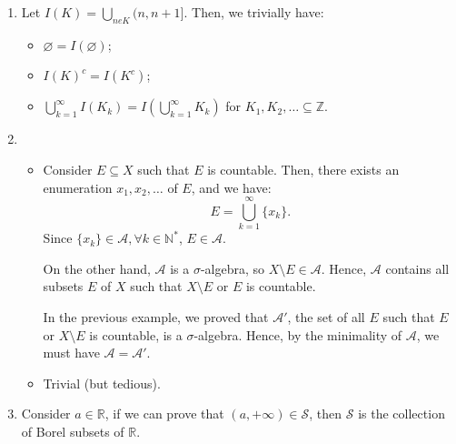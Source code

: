 \begin{enumerate}[label=\textbf{2B.\arabic*}]
  \item Let \( I(K) = \bigcup_{n e K} (n, n + 1] \). Then, we trivially have:
    \begin{itemize}
      \item \( \varnothing = I(\varnothing) \);
      \item \( I(K)^{c} = I(K^{c}) \);
      \item \( \bigcup_{k = 1}^{\infty} I(K_{k}) = I \left( \bigcup_{k =
        1}^{\infty} K_{k} \right)  \) for \( K_{1}, K_{2}, \ldots \subseteq
        \mathbb{Z} \).
    \end{itemize}
  \item 
    \begin{itemize}
    \item 
    Consider \( E \subseteq X \) such that \( E \) is countable. Then, there
    exists an enumeration \( x_{1}, x_{2}, \ldots  \) of \( E \), and we have:
    \[
      E = \bigcup_{k = 1}^{\infty} \{x_{k}\}
    .\] 
    Since \( \{x_{k}\} \in \mathcal{A}, \forall k \in \mathbb{N}^{*}  \), \( E
    \in \mathcal{A} \).

    On the other hand, \( \mathcal{A} \) is a \( \sigma \)-algebra, so \( X
    \setminus E \in \mathcal{A} \). Hence, \( \mathcal{A} \) contains all
    subsets \( E \) of \( X \) such that \( X \setminus E \) or \( E \) is
    countable.

    In the previous example, we proved that \( \mathcal{A}' \), the set of all
    \( E \) such that \( E \) or \( X \setminus E \) is countable, is a \(
    \sigma \)-algebra. Hence, by the minimality of \( \mathcal{A} \), we must
    have \( \mathcal{A} = \mathcal{A}' \).

  \item Trivial (but tedious).
    \end{itemize}

  \item \label{2B3}
    Consider \( a \in \mathbb{R} \), if we can prove that \( (a, +\infty) \in
    \mathcal{S} \), then \( \mathcal{S} \) is the collection of Borel subsets of
    \( \mathbb{R} \).


\end{enumerate}
